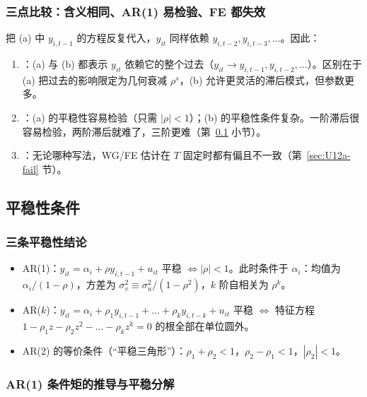 \subsubsection{三点比较：含义相同、AR(1) 易检验、FE 都失效}

把 (a) 中 $y_{i,t-1}$ 的方程反复代入，$y_{it}$ 同样依赖 $y_{i,t-2},y_{i,t-3},\dots$。因此：
\begin{enumerate}
  \item {}：(a) 与 (b) 都表示 $y_{it}$ 依赖它的整个过去（$y_{it}\to y_{i,t-1},y_{i,t-2},\dots$）。区别在于 (a) 把过去的影响限定为几何衰减 $\rho^s$，(b) 允许更灵活的滞后模式，但参数更多。
  \item {}：(a) 的平稳性容易检验（只需 $|\rho|<1$）；(b) 的平稳性条件复杂。一阶滞后很容易检验，两阶滞后就难了，三阶更难（第~\ref{sec:U12a-stat} 小节）。
  \item {}：无论哪种写法，WG/FE 估计在 $T$ 固定时都有偏且不一致（第~\ref{sec:U12a-fail} 节）。
\end{enumerate}

\subsection{平稳性条件}\label{sec:U12a-stat}

\subsubsection{三条平稳性结论}

\begin{thm}[平稳性条件]\label{thm:U12a-stat}
\begin{itemize}
  \item AR(1)：$y_{it}=\alpha_i+\rho y_{i,t-1}+u_{it}$ 平稳 $\iff|\rho|<1$。此时条件于 $\alpha_i$：均值为 $\alpha_i/(1-\rho)$，方差为 $\sigma_v^2\equiv\sigma_u^2/(1-\rho^2)$，$k$ 阶自相关为 $\rho^k$。
  \item AR($k$)：$y_{it}=\alpha_i+\rho_1y_{i,t-1}+\dots+\rho_ky_{i,t-k}+u_{it}$ 平稳 $\iff$ 特征方程 $1-\rho_1z-\rho_2z^2-\dots-\rho_kz^k=0$ 的根全部在单位圆外。
  \item AR(2) 的等价条件（“平稳三角形”）：$\rho_1+\rho_2<1$，$\rho_2-\rho_1<1$，$|\rho_2|<1$。
\end{itemize}
\end{thm}

\subsubsection{AR(1) 条件矩的推导与平稳分解}

